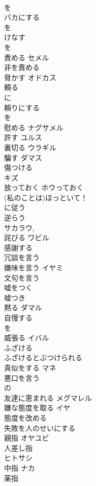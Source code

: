 \documentclass[8pt]{extreport}
\begin{document}
\begin{CJK}{UTF8}{min}
\\	を
\\	バカにする	
\\	を
\\	けなす	
\\	を
\\	責める	セメル 
\\	非を責める 
\\	脅かす	オドカス 
\\	頼る	
\\	に
\\	頼りにする	
\\	を
\\	慰める	ナグサメル 
\\	許す	ユルス 
\\	裏切る	ウラギル 
\\	騙す	ダマス 
\\	傷つける	
\\	キズ
\\	放っておく	ホウっておく 
\\	(私のことは)ほっといて！
\\	に従う 
\\	逆らう	
\\	サカラウ, 
\\	詫びる	ワビル 
\\	感謝する	
\\	冗談を言う	
\\	嫌味を言う	イヤミ 
\\	文句を言う	
\\	嘘をつく	
\\	嘘つき	
\\	黙る	ダマル 
\\	自慢する	
\\	を
\\	威張る	イバル 
\\	ふざける	
\\	ふざけるとぶつけられる 
\\	真似をする	マネ 
\\	悪口を言う	
\\	の
\\	友達に恵まれる	メグマレル 
\\	嫌な態度を取る	イヤ 
\\	態度を改める	
\\	失敗を人のせいにする	
\\	親指	オヤユビ 
\\	人差し指	
\\	ヒトサシ
\\	中指	ナカ 
\\	薬指	

\end{CJK}
\end{document}
